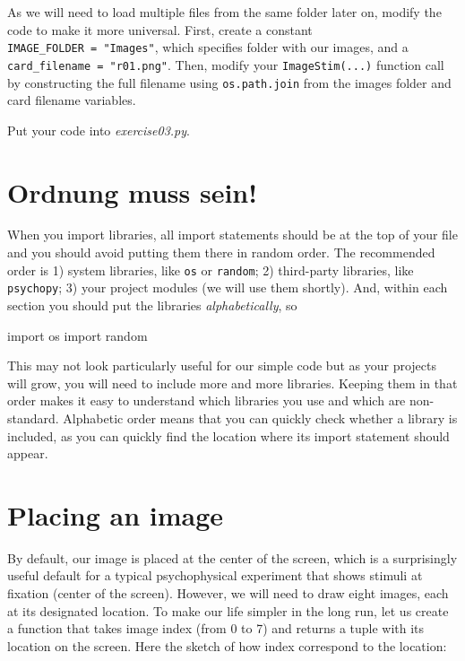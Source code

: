 \documentclass[
]{book}
\newenvironment{Shaded}{\begin{snugshade}}{\end{snugshade}}
\newcommand{\ImportTok}[1]{#1}
\newcommand{\NormalTok}[1]{#1}
\begin{document}
As we will need to load multiple files from the same folder later on, modify the code to make it more universal. First, create a constant \texttt{IMAGE\_FOLDER\ =\ "Images"}, which specifies folder with our images, and a \texttt{card\_filename\ =\ "r01.png"}. Then, modify your \texttt{ImageStim(...)} function call by constructing the full filename using \texttt{os.path.join} from the images folder and card filename variables.

Put your code into \emph{exercise03.py}.

\hypertarget{ordnung-muss-sein}{%
\section{Ordnung muss sein!}\label{ordnung-muss-sein}}

When you import libraries, all import statements should be at the top of your file and you should avoid putting them there in random order. The recommended order is 1) system libraries, like \texttt{os} or \texttt{random}; 2) third-party libraries, like \texttt{psychopy}; 3) your project modules (we will use them shortly). And, within each section you should put the libraries \emph{alphabetically}, so

\begin{Shaded}
\begin{Highlighting}[]
\ImportTok{import}\NormalTok{ os}
\ImportTok{import}\NormalTok{ random}
\end{Highlighting}
\end{Shaded}

This may not look particularly useful for our simple code but as your projects will grow, you will need to include more and more libraries. Keeping them in that order makes it easy to understand which libraries you use and which are non-standard. Alphabetic order means that you can quickly check whether a library is included, as you can quickly find the location where its import statement should appear.

\hypertarget{placing-an-image}{%
\section{Placing an image}\label{placing-an-image}}

By default, our image is placed at the center of the screen, which is a surprisingly useful default for a typical psychophysical experiment that shows stimuli at fixation (center of the screen). However, we will need to draw eight images, each at its designated location. To make our life simpler in the long run, let us create a function that takes image index (from 0 to 7) and returns a tuple with its location on the screen. Here the sketch of how index correspond to the location:
\end{document}
